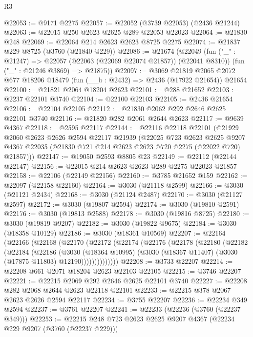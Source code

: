 \begin{lexlean}{R3}
\begin{coremodule}
@22053 := @9171 @2275
@22057 := @22052 (@3739 @22053) (@2436 @21244)
@22063 := @22015 @250 @2623 @2625 @289 @22053 @22023
@22064 := @21830 @248
@22069 := @22064 @214 @2623 @2623 @8725 @2275
@22074 := @21837 @229 @8725 (@3760 (@21840 @229))
@22086 := @21674
    (@22049
      (fun ("_" : @21247) => @22057 (@22063 (@22069 @22074 @21857)) (@22041 @8310))
      (fun ("_" : @21246 @3869) => @21875))
@22097 := @3069
    @21819
    @2065
    @2072
    @677
    @18206
    @18479
    (fun (__b : @2432) => @2436 (@17922 @21654))
    @21654
@22100 := @21821 @2064 @18204 @2623
@22101 := @288 @21652
@22103 := @2237 @22101 @3740
@22104 := @22100 @22103
@22105 := @2436 @21654
@22106 := @22104 @22105
@22112 := @21830 @2062 @292 @2646 @2625 @22101 @3740
@22116 := @21820 @282 @2061 @2644 @2623
@22117 := @9639 @4367
@22118 := @2595 @22117
@22144 := @22116
    @22118
    @22101
    (@21929
      @2060
      @2623
      @2626
      @2594
      @22117
      @21939
      (@22025
        @723
        @2623
        @2625
        @9207
        @4367
        @22035
        (@21830 @721 @214 @2623 @2623 @720 @2275 (@22022 @720) @21857)))
@22147 := @19050 @2593 @8805 @23
@22149 := @22112 (@22144 @22147)
@22156 := @22015 @214 @2623 @2623 @289 @2275 @22023 @21857
@22158 := @22106 (@22149 @22156)
@22160 := @3785 @21652 @159
@22162 := @22097 (@22158 @22160)
@22164 := @3030 (@21118 @2599)
@22166 := @3030 (@21121 @2434)
@22168 := @3030 (@21124 @2487)
@22170 := @3030 (@21127 @2597)
@22172 := @3030 (@19807 @2594)
@22174 := @3030 (@19810 @2591)
@22176 := @3030 (@19813 @2588)
@22178 := @3030 (@19816 @8725)
@22180 := @3030 (@19819 @9207)
@22182 := @3030 (@19822 @9675)
@22184 := @3030 (@18358 @10129)
@22186 := @3030 (@18361 @10569)
@22207 := @22164
    (@22166
      (@22168
        (@22170
          (@22172
            (@22174
              (@22176
                (@22178
                  (@22180
                    (@22182
                      (@22184
                        (@22186
                          (@3030
                            (@18364 @10995)
                            (@3030 (@18367 @11407) (@3030 (@17875 @11803) @12190))))))))))))))
@22208 := @3733 @22207
@22214 := @22208 @661 @2071 @18204 @2623 @22103 @22105
@22215 := @3746 @22207
@22221 := @22215 @2069 @292 @2646 @2625 @22101 @3740
@22227 := @22208 @282 @2068 @2644 @2623 @22118 @22101
@22233 := @22215 @378 @2067 @2623 @2626 @2594 @22117
@22234 := @3755 @22207
@22236 := @22234 @349 @2594
@22237 := @3761 @22207
@22241 := @22233 (@22236 (@3760 (@22237 @349)))
@22253 := @22215 @248 @723 @2623 @2625 @9207 @4367 (@22234 @229 @9207 (@3760 (@22237 @229)))

\end{coremodule}
\end{lexlean}

